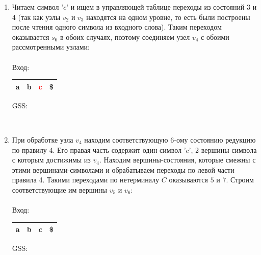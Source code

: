 \begin{example}
\begin{enumerate}
        \item Читаем символ '$c$' и ищем в управляющей таблице переходы из состояний 3 и 4 (так как узлы $v_2$ и $v_3$ находятся на одном уровне, то есть были построены после чтения одного символа из входного слова). Таким переходом оказывается $s_6$ в обоих случаях, поэтому соединяем узел $v_4$ с обоими рассмотренными узлами:\\ \\
        Вход: \,
        \begin{tabular}[c]{ |c|c|c|c| }
            \hline a & b & \textcolor{red}{c} & \$ \\ \hline
        \end{tabular}
        \qquad GSS: \,
        
        \\

        \item При обработке узла $v_4$ находим соответствующую 6-ому состоянию редукцию по правилу 4. Его правая часть содержит один символ '$c$', 2 вершины-символа с которым достижимы из $v_4$. Находим вершины-состояния, которые смежны с этими вершинами-символами и обрабатываем переходы по левой части правила 4. Такими переходами по нетерминалу $C$ оказываются $5$ и $7$. Строим соответствующие им вершины $v_5$ и $v_6$:\\ \\
        Вход: \,
        \begin{tabular}[c]{ |c|c|c|c| }
            \hline a & b & c & \$ \\ \hline
        \end{tabular}
        \qquad GSS: \,
        
        \\


\end{enumerate}
\end{example}

